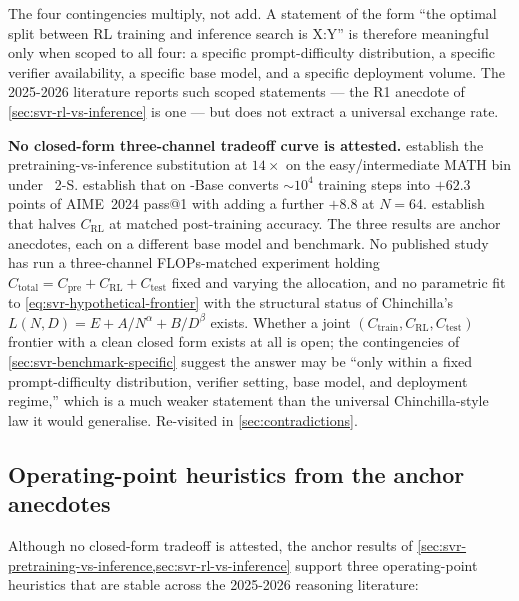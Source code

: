 The four contingencies multiply, not add. A statement of the form
``the optimal split between RL training and inference search is X:Y''
is therefore meaningful only when scoped to all four: a specific
prompt-difficulty distribution, a specific verifier availability, a
specific base model, and a specific deployment volume. The 2025-2026
literature reports such scoped statements --- the R1 anecdote of
\cref{sec:svr-rl-vs-inference} is one --- but does not extract a
universal exchange rate.

\begin{contradiction}
\textbf{No closed-form three-channel tradeoff curve is attested.}
\citet[\S 6]{snell2024} establish the pretraining-vs-inference
substitution at $14\times$ on the easy/intermediate MATH bin under
~2-S\*. \citet[\S 2.3]{deepseek-r1} establish that  on
-Base converts $\sim\!10^{4}$ training steps into $+62.3$
points of AIME~2024 pass@1 with  adding a further
$+8.8$ at $N = 64$. \citet[\S 4]{dapo2025} establish that  halves
$C_\text{RL}$ at matched post-training accuracy. The three results
are anchor anecdotes, each on a different base model and benchmark.
No published study has run a three-channel FLOPs-matched experiment
holding $C_\text{total} = C_\text{pre} + C_\text{RL} + C_\text{test}$
fixed and varying the allocation, and no parametric fit
to \cref{eq:svr-hypothetical-frontier} with the structural status of
Chinchilla's $L(N, D) = E + A/N^\alpha + B/D^\beta$ exists. Whether a
joint $(C_\text{train}, C_\text{RL}, C_\text{test})$ frontier with a
clean closed form exists at all is open; the contingencies of
\cref{sec:svr-benchmark-specific} suggest the answer may be ``only
within a fixed prompt-difficulty distribution, verifier setting, base
model, and deployment regime,'' which is a much weaker statement than
the universal Chinchilla-style law it would generalise. Re-visited in
\cref{sec:contradictions}.
\end{contradiction}

\subsection{Operating-point heuristics from the anchor anecdotes}
\label{sec:svr-heuristics}

Although no closed-form tradeoff is attested, the anchor results of
\cref{sec:svr-pretraining-vs-inference,sec:svr-rl-vs-inference}
support three operating-point heuristics that are stable across the
2025-2026 reasoning literature:

